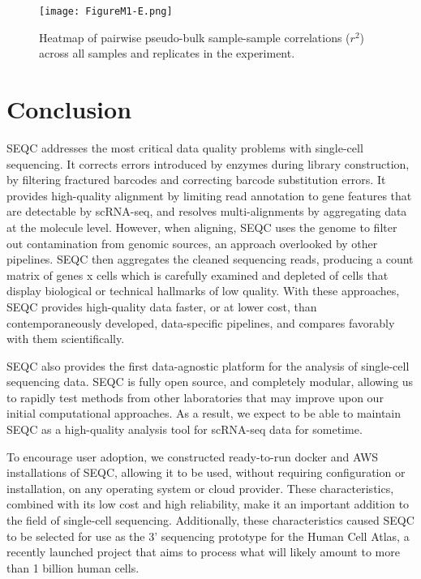 \begin{figure}
\centering
\texttt{[image: FigureM1-E.png]}
\caption{Heatmap of pairwise pseudo-bulk sample-sample correlations ($r^2$) across all samples
and replicates in the experiment.
}
\label{fig:m1e}
\end{figure}

\section{Conclusion}

SEQC addresses the most critical data quality problems with single-cell sequencing. 
It corrects errors introduced by enzymes during library construction, by filtering fractured barcodes and correcting barcode substitution errors. 
It provides high-quality alignment by limiting read annotation to gene features that are detectable by scRNA-seq, and resolves multi-alignments by aggregating data at the molecule level.  
However, when aligning, SEQC uses the genome to filter out contamination from genomic sources, an approach overlooked by other pipelines. 
SEQC then aggregates the cleaned sequencing reads, producing a count matrix of genes x cells which is carefully examined and depleted of cells that display biological or technical hallmarks of low quality. 
With these approaches, SEQC provides high-quality data faster, or at lower cost, than contemporaneously developed, data-specific pipelines, and compares favorably with them scientifically.  %

SEQC also provides the first data-agnostic platform for the analysis of single-cell sequencing data.
SEQC is fully open source, and completely modular, allowing us to rapidly test methods from other laboratories that may improve upon our initial computational approaches. 
As a result, we expect to be able to maintain SEQC as a high-quality analysis tool for scRNA-seq data for sometime. 

To encourage user adoption, we constructed ready-to-run docker and AWS installations of SEQC, allowing it to be used, without requiring configuration or installation, on any operating system or cloud provider. 
These characteristics, combined with its low cost and high reliability, make it an important addition to the field of single-cell sequencing. 
Additionally, these characteristics caused SEQC to be selected for use as the 3' sequencing prototype for the Human Cell Atlas, a recently launched project that aims to process what will likely amount to more than 1 billion human cells.   

